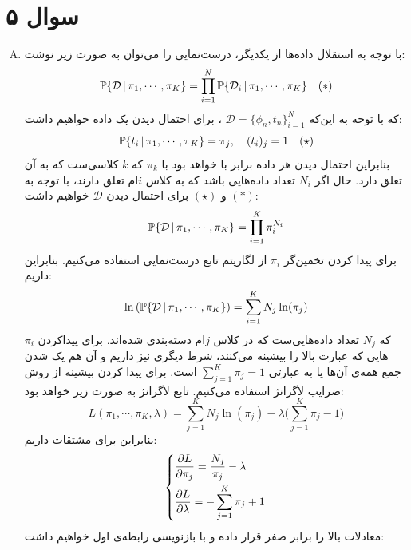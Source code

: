 \documentclass[a4paper, 12pt]{article}
\begin{document}
\section*{سوال ۵}
\begin{enumerate}[A)]
	\item
	با توجه به استقلال داده‌ها از یکدیگر، درست‌نمایی را می‌توان به صورت زیر نوشت:
	\[
	{\mathbb P}\{\mathcal{D}\,|\,\pi_1, \cdots, \pi_K\} = \prod_{i=1}^{N} {\mathbb P}\{\mathcal{D}_i \,|\, \pi_1, \cdots, \pi_K\}  \quad(\ast)
	\]
	که با توحه به این‌که
	$\mathcal{D} = \{\phi_n, t_n\}_{i=1}^{N}$
	، برای احتمال دیدن یک داده خواهیم داشت:
	\[
	{\mathbb P}\{t_i \,|\, \pi_1, \cdots, \pi_K\} = \pi_j, \quad (t_i)_j = 1 \quad(\star)
	\]
	بنابراین احتمال دیدن هر داده برابر با خواهد بود با $\pi_k$ که $k$ کلاسی‌ست که به آن تعلق دارد. حال اگر $N_i$ تعداد داده‌هایی باشد که به کلاس $i$ام تعلق دارند، با توجه به $(\ast)$ و $(\star)$ برای احتمال دیدن $\mathcal{D}$ خواهیم داشت:
	\[
	{\mathbb P}\{\mathcal{D}\,|\,\pi_1,\cdots,\pi_K\} = \prod_{i=1}^K \pi_i^{N_i}
	\]
	برای پیدا کردن تخمین‌گر $\pi_i$ از لگاریتم تابع درست‌نمایی استفاده می‌کنیم. بنابراین داریم:
	\[
	\ln\left({\mathbb P}\{\mathcal{D}\,|\,\pi_1,\cdots,\pi_K\}\right) = \sum_{i=1}^K N_j\ln(\pi_j)
	\]
	که $N_j$ تعداد داده‌هایی‌ست که در کلاس $j$ام دسته‌بندی شده‌اند. برای پیداکردن $\pi_i$هایی که عبارت بالا را بیشینه می‌کنند، شرط دیگری نیز داریم و آن هم یک شدن جمع همه‌ی آن‌ها یا به عبارتی
	$\sum_{j=1}^{K}\pi_j = 1$
	است. برای پیدا کردن بیشینه از روش ضرایب لاگرانژ استفاده می‌کنیم. تابع لاگرانژ به صورت زیر خواهد بود:
	\[
	L(\pi_1,\cdots,\pi_K, \lambda) = \sum_{j=1}^{K}N_j\ln(\pi_j) - \lambda \big(\sum_{j=1}^K \pi_j - 1\big)
	\]
	بنابراین برای مشتقات داریم:
	\[
	\begin{dcases}
		\frac{\partial L}{\partial \pi_j} = \frac{N_j}{\pi_j} - \lambda \\
		\frac{\partial L}{\partial \lambda} = -\sum_{j=1}^K \pi_j + 1
	\end{dcases}
	\]
	معادلات بالا را برابر صفر قرار داده و با بازنویسی رابطه‌ی اول خواهیم داشت:
	\[
	\begin{aligned}

\end{aligned}\]
\end{enumerate}
\end{document}
